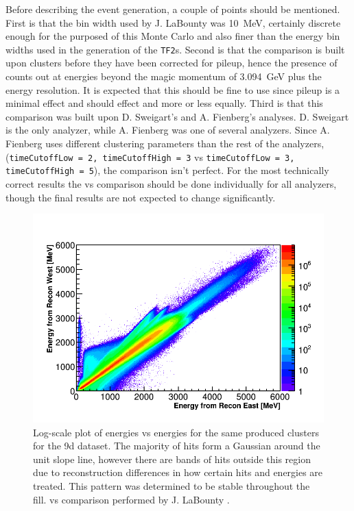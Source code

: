 Before describing the event generation, a couple of points should be mentioned. First is that the bin width used by J. LaBounty was \SI{10}{\MeV}, certainly discrete enough for the purposed of this Monte Carlo and also finer than the energy bin widths used in the generation of the \texttt{TF2}s. Second is that the comparison is built upon clusters before they have been corrected for pileup, hence the presence of counts out at energies beyond the magic momentum of \SI{3.094}{\GeV} plus the energy resolution. It is expected that this should be fine to use since pileup is a minimal effect and should effect \RE and \RW more or less equally. Third is that this comparison was built upon D. Sweigart's and A. Fienberg's analyses. D. Sweigart is the only \RE analyzer, while A. Fienberg was one of several \RW analyzers. Since A. Fienberg uses different clustering parameters than the rest of the \RW analyzers, (\texttt{timeCutoffLow = 2, timeCutoffHigh = 3} vs \texttt{timeCutoffLow = 3, timeCutoffHigh = 5}), the comparison isn't perfect. For the most technically correct results the \RE vs \RW comparison should be done individually for all analyzers, though the final results are not expected to change significantly.



\begin{figure}[]
\centering
\includegraphics[width=.7\textwidth]{ReconEastvWest_Energies}
\caption{Log-scale plot of \RE energies vs \RW energies for the same produced clusters for the 9d dataset. The majority of hits form a Gaussian around the unit slope line, however there are bands of hits outside this region due to reconstruction differences in how certain hits and energies are treated. This pattern was determined to be stable throughout the fill. \RE vs \RW comparison performed by J. LaBounty \cite{JoshEvW}.}
\label{fig:EvWenergies}
\end{figure}

